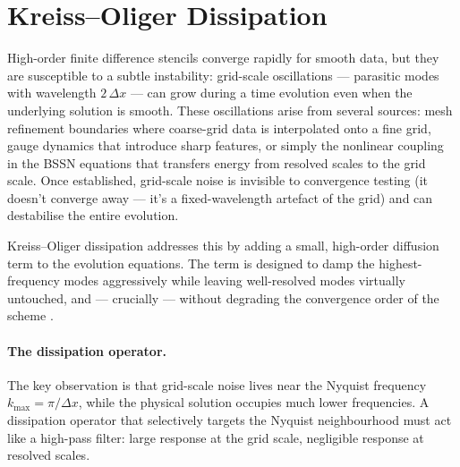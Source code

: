\section{Kreiss--Oliger Dissipation}
\label{sec:fd-dissipation}

High-order finite difference stencils converge rapidly for smooth data,
but they are susceptible to a subtle instability: grid-scale oscillations
--- parasitic modes with wavelength $2\,\Delta x$ --- can grow during a
time evolution even when the underlying solution is smooth.  These
oscillations arise from several sources: mesh refinement boundaries where
coarse-grid data is interpolated onto a fine grid, gauge dynamics that
introduce sharp features, or simply the nonlinear coupling in the BSSN
equations that transfers energy from resolved scales to the grid scale.
Once established, grid-scale noise is invisible to convergence testing
(it doesn't converge away --- it's a fixed-wavelength artefact of the
grid) and can destabilise the entire evolution.

Kreiss--Oliger dissipation addresses this by adding a small, high-order
diffusion term to the evolution equations.  The term is designed to damp
the highest-frequency modes aggressively while leaving well-resolved modes
virtually untouched, and --- crucially --- without degrading the
convergence order of the scheme \cite{Gustafsson1995}.

\paragraph{The dissipation operator.}

The key observation is that grid-scale noise lives near the Nyquist
frequency $k_{\text{max}} = \pi/\Delta x$, while the physical solution
occupies much lower frequencies.  A dissipation operator that selectively
targets the Nyquist neighbourhood must act like a high-pass filter: large
response at the grid scale, negligible response at resolved scales.

